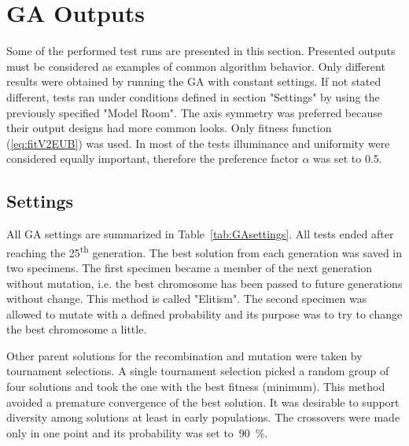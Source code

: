 \section{GA Outputs}
Some of the performed test runs are presented in this section. Presented outputs must be considered as examples of common algorithm behavior. Only different results were obtained by running the GA with constant settings. If not stated different, tests ran under conditions defined in section "Settings" by using the previously specified "Model Room". The axis symmetry was preferred because their output designs had more common looks. Only fitness function (\ref{eq:fitV2EUB}) was used. In most of the tests illuminance and uniformity were considered equally important, therefore the preference factor $\alpha$ was set to 0.5.

\subsection{Settings}

All GA settings are summarized in Table~\ref{tab:GAsettings}. All tests ended after reaching the 25\textsuperscript{th} generation. The best solution from each generation was saved in two specimens. The first specimen became a member of the next generation without mutation, i.e. the best chromosome has been passed to future generations without change. This method is called "Elitism". The second specimen was allowed to mutate with a defined probability and its purpose was to try to change the best chromosome a little.

Other parent solutions for the recombination and mutation were taken by tournament selections. A single tournament selection picked a random group of four solutions and took the one with the best fitness (minimum). This method avoided a premature convergence of the best solution. It was desirable to support diversity among solutions at least in early populations. The crossovers were made only in one point and its probability was set to~90~\%.

